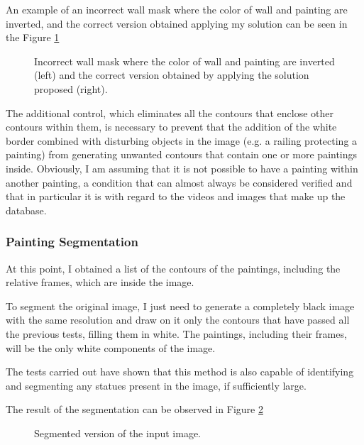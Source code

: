 \documentclass[10pt,twocolumn,letterpaper]{article}
\begin{document}
An example of an incorrect wall mask where the color of wall and painting are inverted, and the correct version obtained applying my solution can be seen in the Figure \ref{fig:wallMaskCorrection}


\begin{figure}[t]
   \begin{center}
   \fbox{\rule{0pt}{2in} \rule{0.9\linewidth}{0pt}}
   \end{center}
      \caption{Incorrect wall mask where the color of wall and painting are inverted (left) and the correct version obtained by applying the solution proposed (right).}
   \label{fig:wallMaskCorrection}
\end{figure}


The additional control, which eliminates all the contours that enclose other contours within them, is necessary to prevent that the addition of the white border combined with disturbing objects in the image (e.g. a railing protecting a painting) from generating unwanted contours that contain one or more paintings inside. Obviously, I am assuming that it is not possible to have a painting within another painting, a condition that can almost always be considered verified and that in particular it is with regard to the videos and images that make up the database.

\subsubsection{Painting Segmentation}

At this point, I obtained a list of the contours of the paintings, including the relative frames, which are inside the image.

To segment the original image, I just need to generate a completely black image with the same resolution and draw on it only the contours that have passed all the previous tests, filling them in white. The paintings, including their frames, will be the only white components of the image. 

The tests carried out have shown that this method is also capable of identifying and segmenting any statues present in the image, if sufficiently large. 

The result of the segmentation can be observed in Figure \ref{fig:imageSegmented}

\begin{figure}[t]
   \begin{center}
   \fbox{\rule{0pt}{2in} \rule{0.9\linewidth}{0pt}}
   \end{center}
      \caption{Segmented version of the input image.}
   \label{fig:imageSegmented}
\end{figure}
\end{document}
